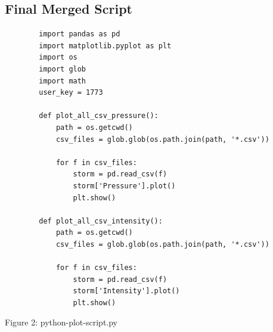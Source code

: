 \documentclass[]{article}
\begin{document}
\subsection{Final Merged Script}
\begin{tcolorbox}[enhanced, 
    listing only,
    title=python-plot-script.py,
    fonttitle=\bfseries,
    colback=white,
    colframe=black!70,
    listing options={
      language=Python,
      numbers=left, 
      numberstyle=\tiny\color{gray},
      breaklines=true, 
      basicstyle=\ttfamily\small, 
      columns=fullflexible,
      keepspaces=true,
      showstringspaces=true,
    },]
    \begin{verbatim}
        import pandas as pd
        import matplotlib.pyplot as plt
        import os
        import glob
        import math
        user_key = 1773
        
        def plot_all_csv_pressure():
            path = os.getcwd()
            csv_files = glob.glob(os.path.join(path, '*.csv'))
            
            for f in csv_files:
                storm = pd.read_csv(f)
                storm['Pressure'].plot()
                plt.show()
        
        def plot_all_csv_intensity():
            path = os.getcwd()
            csv_files = glob.glob(os.path.join(path, '*.csv'))
            
            for f in csv_files:
                storm = pd.read_csv(f)
                storm['Intensity'].plot()
                plt.show()
    \end{verbatim}
\end{tcolorbox}
\begin{center}
    Figure 2: python-plot-script.py
\end{center}
\end{document}
